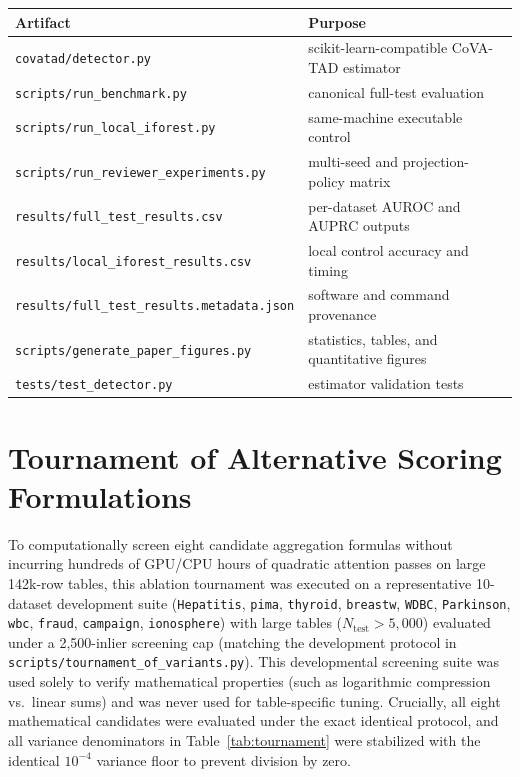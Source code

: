 \documentclass{article}
\begin{document}
\begin{center}
\begin{tabular}{ll}
\toprule
Artifact & Purpose\\
\midrule
\texttt{covatad/detector.py} & scikit-learn-compatible CoVA-TAD estimator\\
\texttt{scripts/run\_benchmark.py} & canonical full-test evaluation\\
\texttt{scripts/run\_local\_iforest.py} & same-machine executable control\\
\texttt{scripts/run\_reviewer\_experiments.py} & multi-seed and projection-policy matrix\\
\texttt{results/full\_test\_results.csv} & per-dataset AUROC and AUPRC outputs\\
\texttt{results/local\_iforest\_results.csv} & local control accuracy and timing\\
\texttt{results/full\_test\_results.metadata.json} & software and command provenance\\
\texttt{scripts/generate\_paper\_figures.py} & statistics, tables, and quantitative figures\\
\texttt{tests/test\_detector.py} & estimator validation tests\\
\bottomrule
\end{tabular}
\end{center}

\section{Tournament of Alternative Scoring Formulations}
\label{app:tournament}

To computationally screen eight candidate aggregation formulas without incurring hundreds of GPU/CPU hours of quadratic attention passes on large 142k-row tables, this ablation tournament was executed on a representative 10-dataset development suite (\texttt{Hepatitis}, \texttt{pima}, \texttt{thyroid}, \texttt{breastw}, \texttt{WDBC}, \texttt{Parkinson}, \texttt{wbc}, \texttt{fraud}, \texttt{campaign}, \texttt{ionosphere}) with large tables ($N_{\text{test}} > 5{,}000$) evaluated under a 2,500-inlier screening cap (matching the development protocol in \texttt{scripts/tournament\_of\_variants.py}). This developmental screening suite was used solely to verify mathematical properties (such as logarithmic compression vs.\ linear sums) and was never used for table-specific tuning. Crucially, all eight mathematical candidates were evaluated under the exact identical protocol, and all variance denominators in Table~\ref{tab:tournament} were stabilized with the identical $10^{-4}$ variance floor to prevent division by zero.
\end{document}
